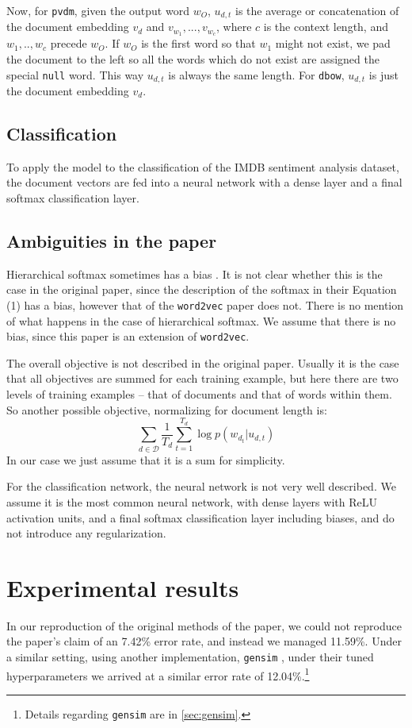 \documentclass{article}
\begin{document}
Now, for \texttt{pvdm}, given the output word $w_O$, $u_{d,t}$ is the average or concatenation of the document embedding $v_d$ and $v_{w_1},...,v_{w_c}$, where $c$ is the context length, and $w_1,..,w_c$ precede $w_O$. If $w_O$ is the first word so that $w_1$ might not exist, we pad the document to the left so all the words which do not exist are assigned the special \texttt{null} word. This way $u_{d,t}$ is always the same length. For \texttt{dbow}, $u_{d,t}$ is just the document embedding $v_d$.

\subsection{Classification}
To apply the model to the classification of the IMDB sentiment analysis dataset, the document vectors are fed into a neural network with a dense layer and a final softmax classification layer.

\subsection{Ambiguities in the paper}
Hierarchical softmax sometimes has a bias \citep{mnih_scalable_2009}. It is not clear whether this is the case in the original paper, since the description of the softmax in their Equation (1) has a bias, however that of the \texttt{word2vec} paper does not. There is no mention of what happens in the case of hierarchical softmax. We assume that there is no bias, since this paper is an extension of \texttt{word2vec}.

The overall objective is not described in the original paper. Usually it is the case that all objectives are summed for each training example, but here there are two levels of training examples -- that of documents and that of words within them. So another possible objective, normalizing for document length is:
    \[\sum_{d\in\mathcal{D}}\frac{1}{T_d}\sum_{t=1}^{T_d} \log p(w_{d_t}|u_{d,t})\]
In our case we just assume that it is a sum for simplicity.

For the classification network, the neural network is not very well described. We assume it is the most common neural network, with dense layers with ReLU activation units, and a final softmax classification layer including biases, and do not introduce any regularization.

\section{Experimental results}
In our reproduction of the original methods of the paper, we could not reproduce the paper's claim of an 7.42\% error rate, and instead we managed 11.59\%. Under a similar setting, using another implementation, \texttt{gensim} \citep{rehurek_software_2010}, under their tuned hyperparameters we arrived at a similar error rate of 12.04\%.\footnote{Details regarding \texttt{gensim} are in \autoref{sec:gensim}.}
\end{document}
